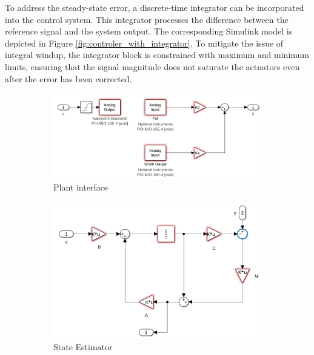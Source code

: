 To address the steady-state error, a discrete-time integrator can be incorporated into the control system. This integrator processes the difference between the reference signal and the system output. The corresponding Simulink model is depicted in Figure \ref{fig:controler_with_integrator}. To mitigate the issue of integral windup, the integrator block is constrained with maximum and minimum limits, ensuring that the signal magnitude does not saturate the actuators even after the error has been corrected.
\begin{figure}[H]
    \centering
    \begin{subfigure}{0.47\textwidth}
        \includegraphics[width=\textwidth]{Figs/Simulink Models/Plant Interface.png}
        \caption{Plant interface}
        \label{fig:plant_interface}
    \end{subfigure}
    \hfill
    \begin{subfigure}{0.37\textwidth}
        \includegraphics[width=\textwidth]{Figs/Simulink Models/State_Estimator.png}
        \caption{State Estimator}
        \label{fig:state_estimator}
    \end{subfigure}
    \begin{subfigure}{0.95\textwidth}

\end{subfigure}
\end{figure}
